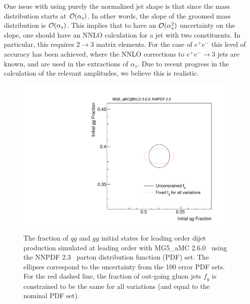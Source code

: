 One issue with using purely the normalized jet shape is that since the mass distribution starts at ${\mathcal O}(\alpha_s)$. In other words, the slope of the groomed mass distribution is ${\mathcal O}(\alpha_s)$. This implies that to have an ${\mathcal O}(\alpha_s^2)$ uncertainty on the slope, one should have an NNLO calculation for a jet with two constituents.  In particular, this requires $2\to 3$ matrix elements. For the case of $e^+e^-$ this level of accuracy has been achieved, where the NNLO corrections to $e^+e^-\to 3$ jets are known, and are used in the extractions of $\alpha_s$. Due to recent progress in the calculation of the relevant amplitudes, we believe this is realistic.



\begin{figure}[h!]
\begin{center}
\includegraphics[width = 0.5\columnwidth]{figures/PDFs.pdf}
\end{center}
\caption{The fraction of $qg$ and $gg$ initial states for leading
  order dijet production 
  simulated at leading order with MG5\_aMC 2.6.0~\cite{Alwall:2014hca}
  using the NNPDF 2.3~\cite{Ball:2012cx} parton distribution function
  (PDF) set.  The ellipses correspond to the uncertainty from the 100
  error PDF sets.  For the red dashed line, the fraction of out-going
  gluon jets $f_g$ is constrained to be the same for all variations
  (and equal to the nominal PDF set).}
\label{fig:pdf}
\end{figure}





























